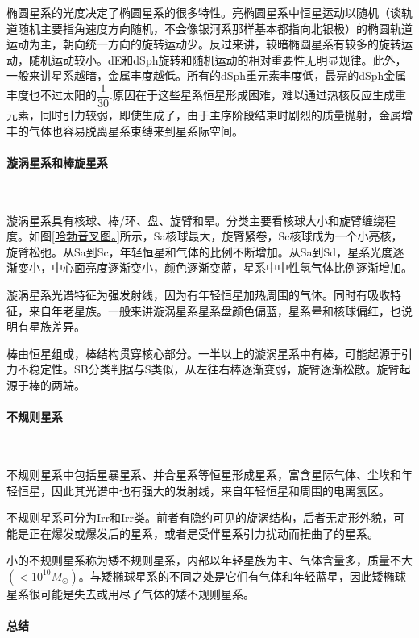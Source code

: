 \documentclass[../天体物理基础.tex]{subfiles}
\begin{document}
椭圆星系的光度决定了椭圆星系的很多特性。亮椭圆星系中恒星运动以随机（谈轨道随机主要指角速度方向随机，不会像银河系那样基本都指向北银极）的椭圆轨道运动为主，朝向统一方向的旋转运动少。反过来讲，较暗椭圆星系有较多的旋转运动，随机运动较小。dE和dSph旋转和随机运动的相对重要性无明显规律。此外，一般来讲星系越暗，金属丰度越低。所有的dSph重元素丰度低，最亮的dSph金属丰度也不过太阳的$\dfrac{1}{30}$.原因在于这些星系恒星形成困难，难以通过热核反应生成重元素，同时引力较弱，即使生成了，由于主序阶段结束时剧烈的质量抛射，金属增丰的气体也容易脱离星系束缚来到星系际空间。

\paragraph{漩涡星系和棒旋星系}~{}

漩涡星系具有核球、棒/环、盘、旋臂和晕。分类主要看核球大小和旋臂缠绕程度。如图\ref{哈勃音叉图。}所示，Sa核球最大，旋臂紧卷，Sc核球成为一个小亮核，旋臂松弛。从Sa到Sc，年轻恒星和气体的比例不断增加。从Sa到Sd，星系光度逐渐变小，中心面亮度逐渐变小，颜色逐渐变蓝，星系中中性氢气体比例逐渐增加。

漩涡星系光谱特征为强发射线，因为有年轻恒星加热周围的气体。同时有吸收特征，来自年老星族。一般来讲漩涡星系星系盘颜色偏蓝，星系晕和核球偏红，也说明有星族差异。

棒由恒星组成，棒结构贯穿核心部分。一半以上的漩涡星系中有棒，可能起源于引力不稳定性。SB分类判据与S类似，从左往右棒逐渐变弱，旋臂逐渐松散。旋臂起源于棒的两端。

\paragraph{不规则星系}~{}

不规则星系中包括星暴星系、并合星系等恒星形成星系，富含星际气体、尘埃和年轻恒星，因此其光谱中也有强大的发射线，来自年轻恒星和周围的电离氢区。

不规则星系可分为Irr\uppercase\expandafter{}和Irr\uppercase\expandafter{}类。前者有隐约可见的旋涡结构，后者无定形外貌，可能是正在爆发或爆发后的星系，或者是受伴星系引力扰动而扭曲了的星系。

小的不规则星系称为矮不规则星系，内部以年轻星族为主、气体含量多，质量不大$(<10^{10}M_{\odot})$。与矮椭球星系的不同之处是它们有气体和年轻蓝星，因此矮椭球星系很可能是失去或用尽了气体的矮不规则星系。

\paragraph{总结}~{}
\end{document}
